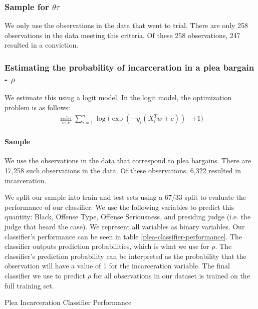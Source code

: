 \documentclass[11pt, oneside]{article}   	%
\theoremstyle{ModifiedStyle}
\begin{document}
		\subsubsection{Sample for $\theta \tau$}
			We only use the observations in the data that went to trial. There are only 258 observations in the data meeting this criteria. Of these 258 observations, 247 resulted in a conviction.

	  \subsubsection{Estimating the probability of incarceration in a plea bargain - $\rho$}
		We estimate this using a logit model. In the logit model, the optimization problem is as follows:
		\begin{align*}
			\min_{w,c} \sum_{i=1}^n \log(\exp(-y_i(X_i^Tw+c)) &+ 1)
		\end{align*}

		\paragraph{Sample} We use the observations in the data that correspond to plea bargains. There are 17,258 such observations in the data. Of these observations, 6,322 resulted in incarceration.

		We split our sample into train and test sets using a 67/33 split to evaluate the performance of our classifier. We use the following variables to predict this quantity: Black, Offense Type, Offense Seriousness, and presiding judge (i.e. the judge that heard the case). We represent all variables as binary variables.  Our classifier's performance can be seen in table \ref{plea-classifier-performance}. The classifier outputs prediction probabilities, which is what we use for $\rho$. The classifier's prediction probability can be interpreted as the probability that the observation will have a value of 1 for the incarceration variable. The final classifier we use to predict $\rho$ for all observations in our dataset is trained on the full training set.

		\begin{table}[H]
			\centering
			\caption{Plea Incarceration Classifier Performance}
			\label{plea-classifier-performance}
			
		  \end{table}
\end{document}
